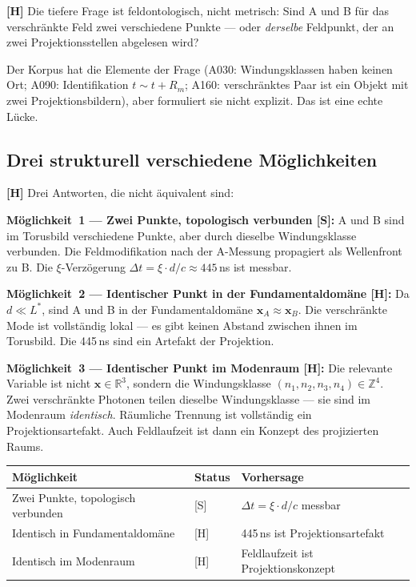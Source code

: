 \textbf{[H]} Die tiefere Frage ist feldontologisch, nicht metrisch:
Sind A und B für das verschränkte Feld zwei verschiedene Punkte ---
oder \emph{derselbe} Feldpunkt, der an zwei Projektionsstellen
abgelesen wird?

Der Korpus hat die Elemente der Frage (A030: Windungsklassen haben
keinen Ort; A090: Identifikation $t \sim t + R_m$; A160: verschränktes
Paar ist ein Objekt mit zwei Projektionsbildern), aber formuliert sie
nicht explizit. Das ist eine echte Lücke.

\subsection{Drei strukturell verschiedene Möglichkeiten}

\textbf{[H]} Drei Antworten, die nicht äquivalent sind:

\textbf{Möglichkeit~1 --- Zwei Punkte, topologisch verbunden [S]:}
A und B sind im Torusbild verschiedene Punkte, aber durch dieselbe
Windungsklasse verbunden. Die Feldmodifikation nach der A-Messung
propagiert als Wellenfront zu B. Die $\xi$-Verzögerung
$\Delta t = \xi \cdot d/c \approx 445$\,ns ist messbar.

\textbf{Möglichkeit~2 --- Identischer Punkt in der
Fundamentaldomäne [H]:}
Da $d \ll L^*$, sind A und B in der Fundamentaldomäne
$\mathbf{x}_A \approx \mathbf{x}_B$. Die verschränkte Mode ist
vollständig lokal --- es gibt keinen Abstand zwischen ihnen im
Torusbild. Die 445\,ns sind ein Artefakt der Projektion.

\textbf{Möglichkeit~3 --- Identischer Punkt im Modenraum [H]:}
Die relevante Variable ist nicht $\mathbf{x} \in \mathbb{R}^3$,
sondern die Windungsklasse $(n_1, n_2, n_3, n_4) \in \mathbb{Z}^4$.
Zwei verschränkte Photonen teilen dieselbe Windungsklasse --- sie sind
im Modenraum \emph{identisch}. Räumliche Trennung ist vollständig ein
Projektionsartefakt. Auch Feldlaufzeit ist dann ein Konzept des
projizierten Raums.

\begin{center}
\small
\begin{tabular}{p{4.5cm}p{2.5cm}p{4cm}}
\toprule
\textbf{Möglichkeit} & \textbf{Status} & \textbf{Vorhersage} \\
\midrule
Zwei Punkte, topologisch verbunden & [S] &
  $\Delta t = \xi \cdot d/c$ messbar \\
Identisch in Fundamentaldomäne & [H] &
  445\,ns ist Projektionsartefakt \\
Identisch im Modenraum & [H] &
  Feldlaufzeit ist Projektionskonzept \\
\bottomrule
\end{tabular}
\end{center}

